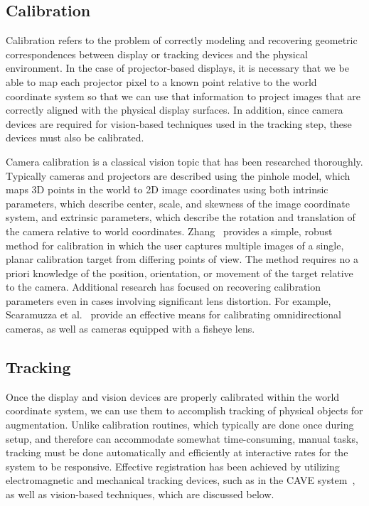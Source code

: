 \documentclass{thesis}
\begin{document}
\subsection{Calibration}

Calibration refers to the problem of correctly modeling and recovering geometric correspondences between display or tracking devices and the physical environment. In the case of projector-based displays, it is necessary that we be able to map each projector pixel to a known point relative to the world coordinate system so that we can use that information to project images that are correctly aligned with the physical display surfaces. In addition, since camera devices are required for vision-based techniques used in the tracking step, these devices must also be calibrated.

Camera calibration is a classical vision topic that has been researched thoroughly. Typically cameras and projectors are described using the pinhole model, which maps 3D points in the world to 2D image coordinates using both intrinsic parameters, which describe center, scale, and skewness of the image coordinate system, and extrinsic parameters, which describe the rotation and translation of the camera relative to world coordinates. Zhang~\cite{Zhang2000} provides a simple, robust method for calibration in which the user captures multiple images of a single, planar calibration target from differing points of view. The method requires no a priori knowledge of the position, orientation, or movement of the target relative to the camera. Additional research has focused on recovering calibration parameters even in cases involving significant lens distortion. For example, Scaramuzza et al.~\cite{Scaramuzza2006} provide an effective means for calibrating omnidirectional cameras, as well as cameras equipped with a fisheye lens.

\subsection{Tracking}

Once the display and vision devices are properly calibrated within the world coordinate system, we can use them to accomplish tracking of physical objects for augmentation. Unlike calibration routines, which typically are done once during setup, and therefore can accommodate somewhat time-consuming, manual tasks, tracking must be done automatically and efficiently at interactive rates for the system to be responsive. Effective registration has been achieved by utilizing electromagnetic and mechanical tracking devices, such as in the CAVE system~\cite{Cruz-Neira1993}, as well as vision-based techniques, which are discussed below.
\end{document}
